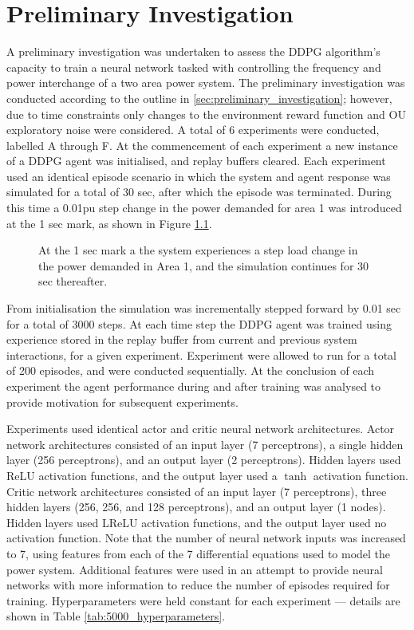 \chapter{Preliminary Investigation}
A preliminary investigation was undertaken to assess the DDPG algorithm's capacity to train a neural network tasked with controlling the frequency and power interchange of a two area power system. The preliminary investigation was conducted according to the outline in \textsection \ref{sec:preliminary_investigation}; however, due to time constraints only changes to the environment reward function and OU exploratory noise were considered. A total of 6 experiments were conducted, labelled A through F. At the commencement of each experiment a new instance of a DDPG agent was initialised, and replay buffers cleared. Each experiment used an identical episode scenario in which the system and agent response was simulated for a total of 30 sec, after which the episode was terminated. During this time a 0.01pu step change in the power demanded for area 1 was introduced at the 1 sec mark, as shown in Figure \ref{fig:5001_demand_profile}.
\begin{figure}[h]
	\centering
	
	\caption{At the 1 sec mark a the system experiences a step load change in the power demanded in Area 1, and the simulation continues for 30 sec thereafter.}
	\label{fig:5001_demand_profile}
\end{figure}

From initialisation the simulation was incrementally stepped forward by 0.01 sec for a total of 3000 steps. At each time step the DDPG agent was trained using experience stored in the replay buffer from current and previous system interactions, for a given experiment. Experiment were allowed to run for a total of 200 episodes, and were conducted sequentially. At the conclusion of each experiment the agent performance during and after training was analysed to provide motivation for subsequent experiments.

Experiments used identical actor and critic neural network architectures. Actor network architectures consisted of an input layer (7 perceptrons), a single hidden layer (256 perceptrons), and an output layer (2 perceptrons). Hidden layers used ReLU activation functions, and the output layer used a $\tanh$ activation function. Critic network architectures consisted of an input layer (7 perceptrons), three hidden layers (256, 256, and 128 perceptrons), and an output layer (1 nodes). Hidden layers used LReLU activation functions, and the output layer used no activation function. Note that the number of neural network inputs was increased to 7, using features from each of the 7 differential equations used to model the power system. Additional features were used in an attempt to provide neural networks with more information to reduce the number of episodes required for training. Hyperparameters were held constant for each experiment --- details are shown in Table \ref{tab:5000_hyperparameters}.

